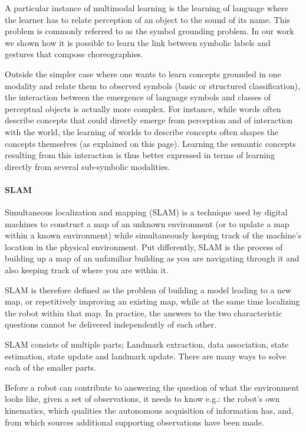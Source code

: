 A particular instance of multimodal learning is the learning of language where the learner has to relate perception of an object to the sound of its name. This problem is commonly referred to as the symbol grounding problem. In our work we shown how it is possible to learn the link between symbolic labels and gestures that compose choreographies.

Outside the simpler case where one wants to learn concepts grounded in one modality and relate them to observed symbols (basic or structured classification), the interaction between the emergence of language symbols and classes of perceptual objects is actually more complex. For instance, while words often describe concepts that could directly emerge from perception and of interaction with the world, the learning of worlds to describe concepts often shapes the concepts themselves (as explained on this page). Learning the semantic concepts resulting from this interaction is thus better expressed in terms of learning directly from several sub-symbolic modalities. 

\paragraph{SLAM}

\cite{smith1990estimating} 
\cite{dissanayake2001solution}

Simultaneous localization and mapping (SLAM) is a technique used by digital machines to construct a map of an unknown environment (or to update a map within a known environment) while simultaneously keeping track of the machine's location in the physical environment. Put differently, SLAM is the process of building up a map of an unfamiliar building as you are navigating through it and also keeping track of where you are within it.

SLAM is therefore defined as the problem of building a model leading to a new map, or repetitively improving an existing map, while at the same time localizing the robot within that map. In practice, the answers to the two characteristic questions cannot be delivered independently of each other.

SLAM consists of multiple parts; Landmark extraction, data association, state estimation, state update and landmark update. There are many ways to solve each of the smaller parts.

Before a robot can contribute to answering the question of what the environment looks like, given a set of observations, it needs to know e.g.: the robot's own kinematics, which qualities the autonomous acquisition of information has, and, from which sources additional supporting observations have been made.

